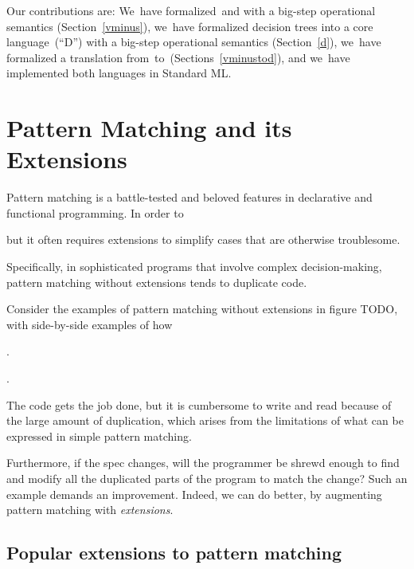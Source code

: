 \documentclass[article,screen,12pt, nonacm]{acmart}
\begin{document}

Our contributions are: 
We~have formalized~\PPlus and \VMinus with a big-step operational semantics
(Section~\ref{vminus}), we~have formalized decision trees into a core
language~\D (“D”) with a big-step operational semantics (Section~\ref{d}), 
we~have formalized a translation from~\VMinus to~\D (Sections~\ref{vminustod}),
and we~have implemented both languages in Standard ML. 



\section{Pattern Matching and its Extensions}
\label{pmandextensions}

    Pattern matching is a battle-tested and beloved features in declarative and
    functional programming. In order to 

    
    
    but it often requires extensions to simplify cases
    that are otherwise troublesome. 
    
    
    Specifically, in sophisticated programs that involve complex
    decision-making, pattern matching without extensions tends to duplicate
    code. 
    
    Consider the examples of pattern matching without extensions in figure 
    TODO, with side-by-side examples of how 



    .

    . 

    The code gets the job done, but it is cumbersome to write and read because
    of the large amount of duplication, which arises from the limitations of
    what can be expressed in simple pattern matching. 
    
    Furthermore, if the spec changes, will the programmer be shrewd enough to
    find and modify all the duplicated parts of the program to match the change?
    Such an example demands an improvement. Indeed, we can do better, by 
    augmenting pattern matching with \textit{extensions}. 


    \subsection{Popular extensions to pattern matching}
    \label{extensions}
\end{document}
